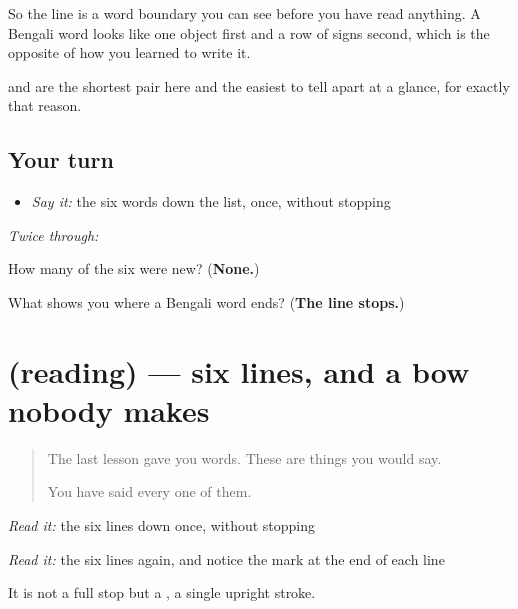 So the line is a word boundary you can see before you have read anything. A Bengali word looks like one object first and a row of signs second, which is the opposite of how you learned to write it.

\textbf{} and \textbf{} are the shortest pair here and the easiest to tell apart at a glance, for exactly that reason.

\subsection*{Your turn}
\begin{itemize}
\raggedright
  \item \emph{Say it:} the six words down the list, once, without stopping
\end{itemize}

\emph{Twice through:}

\begin{tcolorbox}[breakable,colback=teal!4,colframe=teal!35!black,title={Before you move on}]
How many of the six were new? (\textbf{None.})

What shows you where a Bengali word ends? (\textbf{The line stops.})
\end{tcolorbox}
\section[(reading)]{(reading) — six lines, and a bow nobody makes}

\label{lesson:BN-C40-lines}



\begin{quote}
The last lesson gave you words. These are things you would say.

You have said every one of them.
\end{quote}

\begin{tcolorbox}[breakable,skin=enhanced,colback=orange!6,colframe=orange!45!black,boxrule=0.5pt,arc=1mm,left=6pt,right=6pt,top=4pt,bottom=4pt,fonttitle=\bfseries,title={Read this}]
\begin{quote}
      
\end{quote}

\emph{Read it:} the six lines down once, without stopping

\emph{Read it:} the six lines again, and notice the mark at the end of each line

It is not a full stop but a \textbf{}, a single upright stroke.
\end{tcolorbox}

